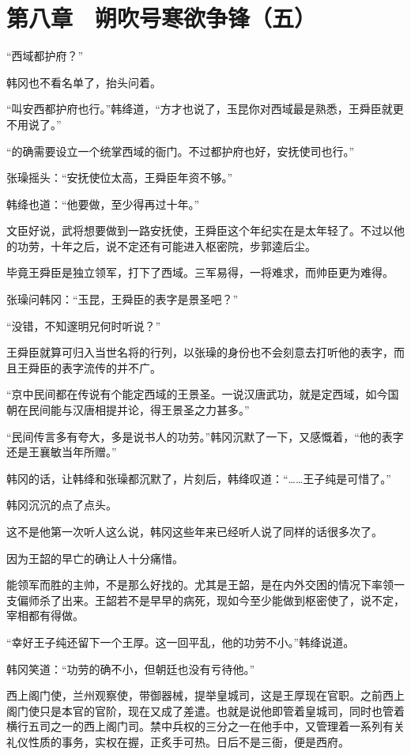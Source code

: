 \section{第八章　朔吹号寒欲争锋（五）}

“西域都护府？”

韩冈也不看名单了，抬头问着。

“叫安西都护府也行。”韩绛道，“方才也说了，玉昆你对西域最是熟悉，王舜臣就更不用说了。”

“的确需要设立一个统掌西域的衙门。不过都护府也好，安抚使司也行。”

张璪摇头：“安抚使位太高，王舜臣年资不够。”

韩绛也道：“他要做，至少得再过十年。”

文臣好说，武将想要做到一路安抚使，王舜臣这个年纪实在是太年轻了。不过以他的功劳，十年之后，说不定还有可能进入枢密院，步郭逵后尘。

毕竟王舜臣是独立领军，打下了西域。三军易得，一将难求，而帅臣更为难得。

张璪问韩冈：“玉昆，王舜臣的表字是景圣吧？”

“没错，不知邃明兄何时听说？”

王舜臣就算可归入当世名将的行列，以张璪的身份也不会刻意去打听他的表字，而且王舜臣的表字流传的并不广。

“京中民间都在传说有个能定西域的王景圣。一说汉唐武功，就是定西域，如今国朝在民间能与汉唐相提并论，得王景圣之力甚多。”

“民间传言多有夸大，多是说书人的功劳。”韩冈沉默了一下，又感慨着，“他的表字还是王襄敏当年所赠。”

韩冈的话，让韩绛和张璪都沉默了，片刻后，韩绛叹道：“……王子纯是可惜了。”

韩冈沉沉的点了点头。

这不是他第一次听人这么说，韩冈这些年来已经听人说了同样的话很多次了。

因为王韶的早亡的确让人十分痛惜。

能领军而胜的主帅，不是那么好找的。尤其是王韶，是在内外交困的情况下率领一支偏师杀了出来。王韶若不是早早的病死，现如今至少能做到枢密使了，说不定，宰相都有得做。

“幸好王子纯还留下一个王厚。这一回平乱，他的功劳不小。”韩绛说道。

韩冈笑道：“功劳的确不小，但朝廷也没有亏待他。”

西上阁门使，兰州观察使，带御器械，提举皇城司，这是王厚现在官职。之前西上阁门使只是本官的官阶，现在又成了差遣。也就是说他即管着皇城司，同时也管着横行五司之一的西上阁门司。禁中兵权的三分之一在他手中，又管理着一系列有关礼仪性质的事务，实权在握，正炙手可热。日后不是三衙，便是西府。


